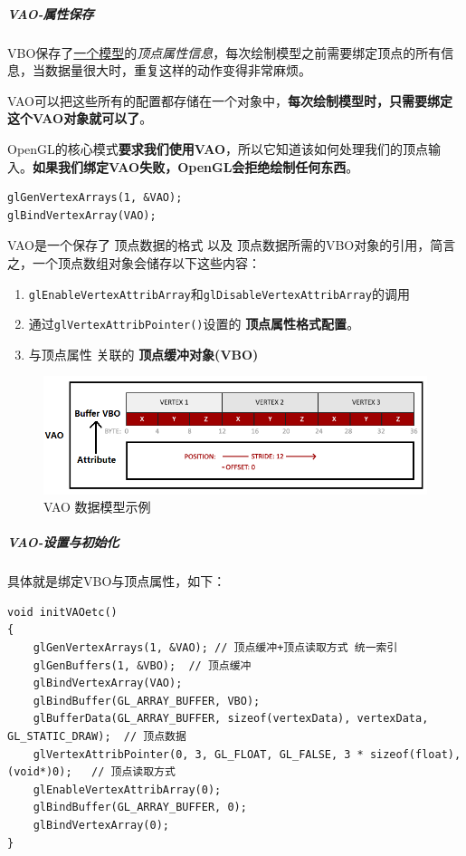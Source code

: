 \documentclass[UTF8,a4paper,12pt]{ctexbook}
\begin{document}
					
					
				\subparagraph{VAO-属性保存}	
					VBO保存了\underline{一个模型}的\textit{顶点属性信息}，每次绘制模型之前需要绑定顶点的所有信息，当数据量很大时，重复这样的动作变得非常麻烦。
					
					VAO可以把这些所有的配置都存储在一个对象中，\textbf{每次绘制模型时，只需要绑定这个VAO对象就可以了}。
					
					OpenGL的核心模式\textbf{要求我们使用VAO}，所以它知道该如何处理我们的顶点输入。\textbf{如果我们绑定VAO失败，OpenGL会拒绝绘制任何东西}。
					
					\begin{lstlisting}
glGenVertexArrays(1, &VAO);			
glBindVertexArray(VAO);		
					\end{lstlisting}
					
					VAO是一个保存了 顶点数据的格式 以及 顶点数据所需的VBO对象的引用，简言之，一个顶点数组对象会储存以下这些内容：
					\begin{enumerate}
						\item \verb|glEnableVertexAttribArray|和\verb|glDisableVertexAttribArray|的调用
						\item 通过\verb|glVertexAttribPointer()|设置的 \textbf{顶点属性格式配置}。
						\item 与顶点属性 关联的 \textbf{顶点缓冲对象(VBO)}
					\end{enumerate}
					
					
					\begin{figure}[H]
						\centering
						\includegraphics[width=\linewidth]{VBO_Attr}
						\caption{VAO 数据模型示例}
					\end{figure}
					
				\subparagraph{VAO-设置与初始化}		
					具体就是绑定VBO与顶点属性，如下：
					\begin{lstlisting}
void initVAOetc()
{
	glGenVertexArrays(1, &VAO);	// 顶点缓冲+顶点读取方式 统一索引
	glGenBuffers(1, &VBO);	// 顶点缓冲
	glBindVertexArray(VAO);
	glBindBuffer(GL_ARRAY_BUFFER, VBO);
	glBufferData(GL_ARRAY_BUFFER, sizeof(vertexData), vertexData, GL_STATIC_DRAW);	// 顶点数据
	glVertexAttribPointer(0, 3, GL_FLOAT, GL_FALSE, 3 * sizeof(float), (void*)0);	// 顶点读取方式
	glEnableVertexAttribArray(0);
	glBindBuffer(GL_ARRAY_BUFFER, 0);
	glBindVertexArray(0);
}					
					\end{lstlisting}
							
\end{document}
